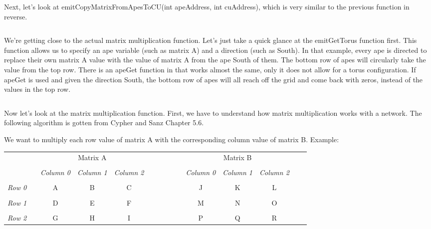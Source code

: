 \documentclass[10pt]{article}
\begin{document}
Next, let’s look at emitCopyMatrixFromApesToCU(int apeAddress, int cuAddress), which is very similar to the previous function in reverse.

\inputminted{c}{mm-emitCopyMatrixFromApesToCU.c}

We’re getting close to the actual matrix multiplication function.  Let’s just take a quick glance at the emitGetTorus function first.  This function allows us to specify an ape variable (such as matrix A) and a direction (such as South).  In that example, every ape is directed to replace their own matrix A value with the value of matrix A from the ape South of them.  The bottom row of apes will circularly take the value from the top row.  There is an apeGet function in that works almost the same, only it does not allow for a torus configuration.  If apeGet is used and given the direction South, the bottom row of apes will all reach off the grid and come back with zeros, instead of the values in the top row.

\inputminted{c}{mm-emitGetTorus.c}

Now let’s look at the matrix multiplication function.  First, we have to understand how matrix multiplication works with a network.  The following algorithm is gotten from Cypher and Sanz Chapter 5.6. \par
We want to multiply each row value of matrix A with the corresponding column value of matrix B.  Example: \par
\begin{tabular}{l*{13}{c}r}
  & & & Matrix A & & & & & & & & Matrix B & \\
  \\
  & &
  \textit{Column 0} &
  \textit{Column 1} &
  \textit{Column 2} & & & & & &
  \textit{Column 0} &
  \textit{Column 1} &
  \textit{Column 2}\\
  \\
  \textit{Row 0} & & A & B & C & & & & & & J & K & L \\
  \\
  \textit{Row 1} & & D & E & F & & & & & & M & N & O \\
  \\
  \textit{Row 2} & & G & H & I & & & & & & P & Q & R\\
  \end{tabular}
  
\end{document}
